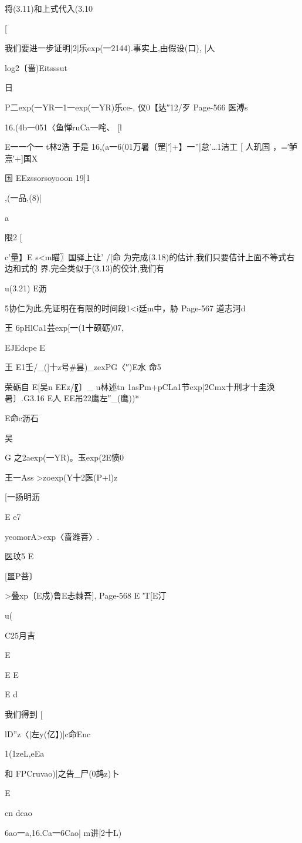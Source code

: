 {{将(3.11)和上式代入(3.10

[

我们要进一步证明|2|乐exp(一2144).事实上,由假设(口),
[人

log2〔啬)Eitsssut

日

P二exp(一YR一1一exp(一YR)乐ce-,
仪0【达″12/歹
Page-566
医溥s

16.(4b一051〈鱼惮ruCa一咤、
[l

E一一个一
t林2浩
于是
16,(a一6(01万暑〔罡]′]+】一”|怠'…1洁工
[
人玑国
，=′鲈熹′+]国X

国
EEzssorsoyooon
19]1

,(一品,(8)|

a

限2
[

c'量】E
s<m瞄〗国驿上让'
/[命
为完成(3.18)的估计,我们只要佶计上面不等式右边和式的
界.完全类似于(3.13)的佼计,我们有

u(3.21)
E沥

5协仁为此,先证明在有限的时间段1<i廷m中，胁
Page-567
道志河d

王
6pHlCa1芸exp[一(1十硕砺)07,

EJEdcpe
E

王
E1壬/_(]十z号#昙)_zexPG〈″)E水
命5

荣砺自
E[吴n
EEz/〖〕_
u林述tn
1asPm+pCLa1节exp|2Cmx十刑才十圭涣暑〕.G3.16
E人
EE吊22鹰左″_(鹰))*

E命c沥石

吴

G
之2aexp(一YR)。玉exp(2E愤0

王一Ass
>zoexp(Y十2医(P+l)z

[一扬明沥

E
e7

yeomorA>exp〈啬潍菩〉.

医玟5
E

[噩P菩〕

>叠xp〔E戍)鲁E忐棘吾],
Page-568
E
′T[E汀

u(

C25月吉

E

E
E

E
d

我们得到
[

lD”z〈|左y(亿】)|c命Enc

1(1zeL,eEa

和
FPCruvao)|之告_尸(0鸪z)卜

E

cn
dcao

6ao一a,16.Ca一6Cao|
m讲[2十L)

}}
